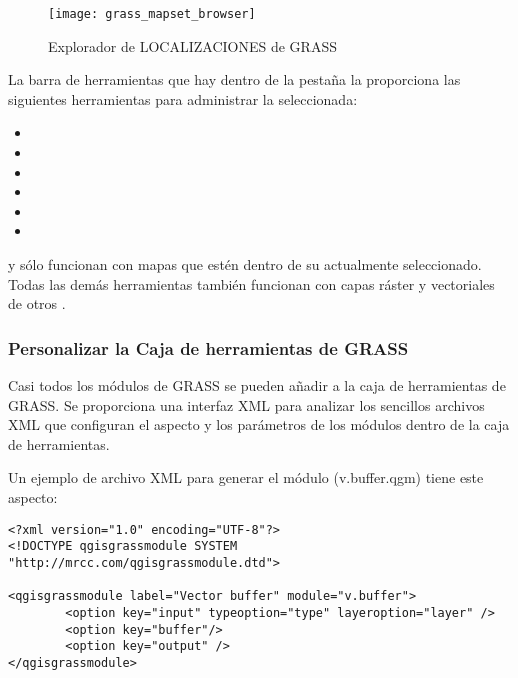 \begin{figure}[h]
 \begin{center}
 \caption{Explorador de LOCALIZACIONES de GRASS \nixcaption}\label{fig:grass_mapset_browser}
 \texttt{[image: grass\_mapset\_browser]}
 \end{center}
\end{figure}

La barra de herramientas que hay dentro de la pestaña  la proporciona las siguientes herramientas para administrar la  seleccionada:

\begin{itemize}
\item {}
\item {}
\item {}
\item {}
\item {}
\item {}
\end{itemize}

 y 
sólo funcionan con mapas que estén dentro de su  actualmente seleccionado. Todas las 
demás herramientas también funcionan con capas ráster y vectoriales de otros .

\subsubsection{Personalizar la Caja de herramientas de GRASS} 
\label{sec:toolbox-customizing}

Casi todos los módulos de GRASS se pueden añadir a la caja de herramientas de GRASS. Se proporciona una interfaz XML para 
analizar los sencillos archivos XML que configuran el aspecto y los parámetros de los módulos dentro de la caja de herramientas. 

Un ejemplo de archivo XML para generar el módulo  (v.buffer.qgm) 
tiene este aspecto:
\begin{verbatim}
<?xml version="1.0" encoding="UTF-8"?>
<!DOCTYPE qgisgrassmodule SYSTEM "http://mrcc.com/qgisgrassmodule.dtd">

<qgisgrassmodule label="Vector buffer" module="v.buffer">
        <option key="input" typeoption="type" layeroption="layer" />
        <option key="buffer"/>
        <option key="output" />
</qgisgrassmodule>
\end{verbatim}

